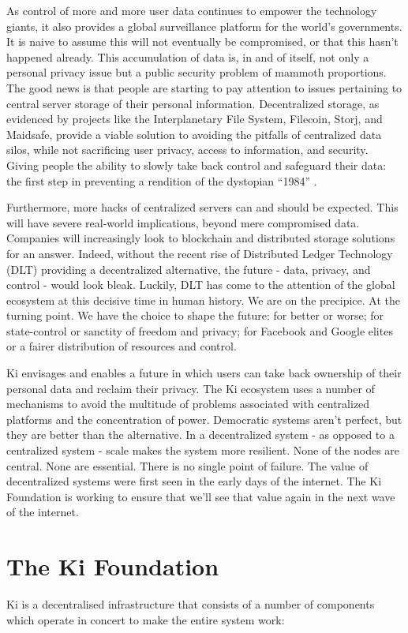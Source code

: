 As control of more and more user data continues to empower the technology giants, it also provides a global surveillance platform for the world's governments. It is naive to assume this will not eventually be compromised, or that this hasn't happened already. This accumulation of data is, in and of itself, not only a personal privacy issue but a public security problem of mammoth proportions. The good news is that people are starting to pay attention to issues pertaining to central server storage of their personal information. Decentralized storage, as evidenced by projects like the Interplanetary File System, Filecoin, Storj, and Maidsafe, provide a viable solution to avoiding the pitfalls of centralized data silos, while not sacrificing user privacy, access to information, and security. Giving people the ability to slowly take back control and safeguard their data: the first step in preventing a rendition of the dystopian ``1984'' \cite{orwell2009nineteen}.

Furthermore, more hacks of centralized servers can and should be expected. This will have severe real-world implications, beyond mere compromised data. Companies will increasingly look to blockchain and distributed storage solutions for an answer. Indeed, without the recent rise of Distributed Ledger Technology (DLT) providing a decentralized alternative, the future - data, privacy, and control - would look bleak. Luckily, DLT has come to the attention of the global ecosystem at this decisive time in human history. We are on the precipice. At the turning point. We have the choice to shape the future: for better or worse; for state-control or sanctity of freedom and privacy; for Facebook and Google elites or a fairer distribution of resources and control.

Ki envisages and enables a future in which users can take back ownership of their personal data  and reclaim their privacy. The Ki ecosystem uses a number of  mechanisms to avoid the multitude of problems associated with centralized platforms and the concentration of power. Democratic systems aren't perfect, but they are better than the alternative. In a decentralized system - as opposed to a centralized system - scale makes the system more resilient. None of the nodes are central. None are essential. There is no single point of failure. The value of decentralized systems were first seen in the early days of the internet. The Ki Foundation is working to ensure that we'll see that value again in the next wave of the internet.


\section{The Ki Foundation}
\label{sec:kifoundation}
Ki is a decentralised infrastructure that consists of a number of components which operate in concert to make the entire system work:

